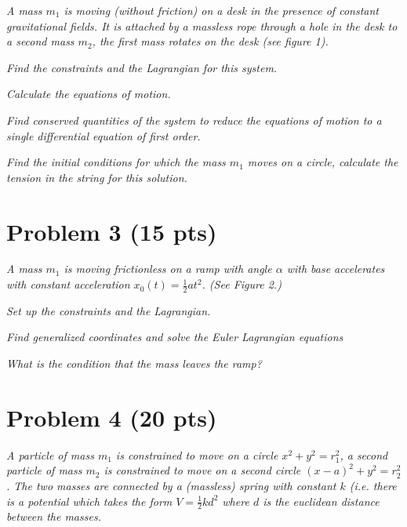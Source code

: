 \documentclass[12pt]{article} %
\begin{document}
\textit{
A mass $m_1$ is moving (without friction) on a desk in the presence of constant gravitational fields. It is attached by a massless rope through a hole in the desk to a second mass $m_2$, the first mass rotates on the desk (see figure 1).
}

\begin{enumproblem}

\item \textit{
Find the constraints and the Lagrangian for this system.
}


\item \textit{
Calculate the equations of motion.
}


\item \textit{
Find conserved quantities of the system to reduce the equations of motion to a single differential equation of first order.
}


\item \textit{
Find the initial conditions for which the mass $m_1$ moves on a circle, calculate the tension in the string for this solution.
}


\end{enumproblem}



\section*{Problem 3 (15 pts)}
\textit{
A mass $m_1$ is moving frictionless on a ramp with angle $\alpha$ with base accelerates with constant acceleration $x_0(t) = \frac{1}{2} a t^2$. (See Figure 2.) 
}

\begin{enumproblem}

\item \textit{
Set up the constraints and the Lagrangian.
}


\item \textit{
Find generalized coordinates and solve the Euler Lagrangian equations 
}


\item \textit{
What is the condition that the mass leaves the ramp?
}


\end{enumproblem}



\section*{Problem 4 (20 pts)}
\textit{
A particle of mass $m_1$ is constrained to move on a circle $x^2 + y^2 = r_1^2$, a second particle of mass $m_2$ is constrained to move on a second circle $(x - a)^2 + y^2 = r_2^2$. The two masses are connected by a (massless) spring with constant $k$ (i.e. there is a potential which takes the form $V = \frac{1}{2} k d^2$ where $d$ is the euclidean distance between the masses.
}
\end{document}
